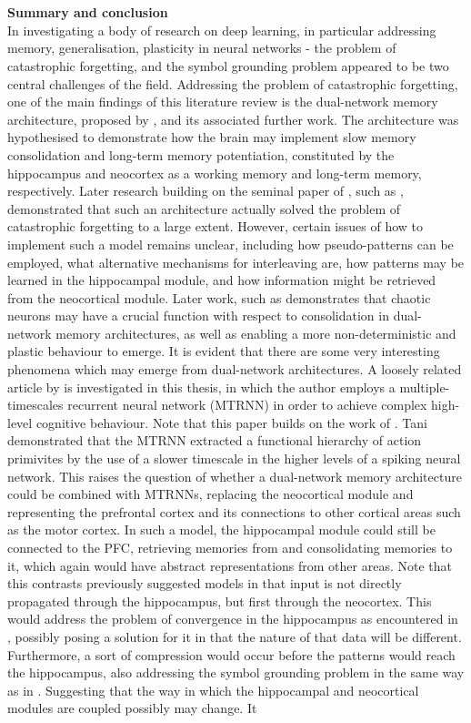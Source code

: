 \\
\\
\textbf{Summary and conclusion}
\\
In investigating a body of research on deep learning, in particular addressing memory, generalisation, plasticity in neural networks - the problem of catastrophic forgetting, and the symbol grounding problem appeared to be two central challenges of the field. Addressing the problem of catastrophic forgetting, one of the main findings of this literature review is the dual-network memory architecture, proposed by \cite{McClelland1995}, and its associated further work. The architecture was hypothesised to demonstrate how the brain may implement slow memory consolidation and long-term memory potentiation, constituted by the hippocampus and neocortex as a working memory and long-term memory, respectively. Later research building on the seminal paper of \cite{McClelland1995}, such as \cite{French1997, Ans1997, Ans2000, French2001, Hattori2010, Hattori2014}, demonstrated that such an architecture actually solved the problem of catastrophic forgetting to a large extent. However, certain issues of how to implement such a model remains unclear, including how pseudo-patterns can be employed, what alternative mechanisms for interleaving are, how patterns may be learned in the hippocampal module, and how information might be retrieved from the neocortical module. Later work, such as \cite{Hattori2014} demonstrates that chaotic neurons may have a crucial function with respect to consolidation in dual-network memory architectures, as well as enabling a more non-deterministic and plastic behaviour to emerge. It is evident that there are some very interesting phenomena which may emerge from dual-network architectures. A loosely related article by \cite{Tani2014} is investigated in this thesis, in which the author employs a multiple-timescales recurrent neural network (MTRNN) in order to achieve complex high-level cognitive behaviour. Note that this paper builds on the work of \cite{Yamashita2008}. Tani demonstrated that the MTRNN extracted a functional hierarchy of action primivites by the use of a slower timescale in the higher levels of a spiking neural network. This raises the question of whether a dual-network memory architecture could be combined with MTRNNs, replacing the neocortical module and representing the prefrontal cortex and its connections to other cortical areas such as the motor cortex. In such a model, the hippocampal module could still be connected to the PFC, retrieving memories from and consolidating memories to it, which again would have abstract representations from other areas. Note that this contrasts previously suggested models in that input is not directly propagated through the hippocampus, but first through the neocortex. This would address the problem of convergence in the hippocampus as encountered in \cite{Ans1997, Ans2000}, possibly posing a solution for it in that the nature of that data will be different. Furthermore, a sort of compression would occur before the patterns would reach the hippocampus, also addressing the symbol grounding problem in the same way as in \cite{Tani2014}. Suggesting that the way in which the hippocampal and neocortical modules are coupled possibly may change. It 